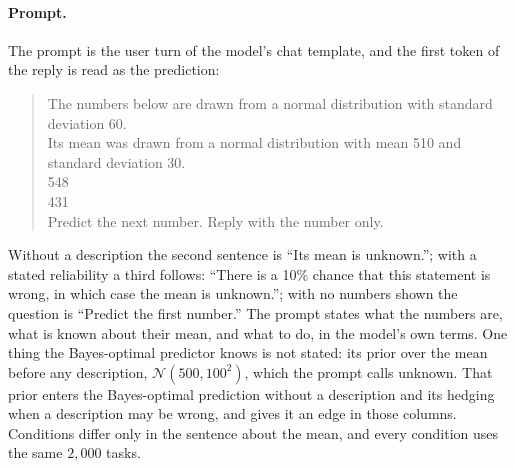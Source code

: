 \documentclass{article}
\begin{document}
\paragraph{Prompt.} The prompt is the user turn of the model's chat template, and the first token of the reply is read as the prediction:

\begin{quote}\small\ttfamily
The numbers below are drawn from a normal distribution with standard deviation 60.\\
Its mean was drawn from a normal distribution with mean 510 and standard deviation 30.\\[3pt]
548\\
431\\[3pt]
Predict the next number. Reply with the number only.
\end{quote}

\noindent Without a description the second sentence is ``Its mean is unknown.''; with a stated reliability a third follows: ``There is a 10\% chance that this statement is wrong, in which case the mean is unknown.''; with no numbers shown the question is ``Predict the first number.'' The prompt states what the numbers are, what is known about their mean, and what to do, in the model's own terms. One thing the Bayes-optimal predictor knows is not stated: its prior over the mean before any description, $\mathcal{N}(500, 100^2)$, which the prompt calls unknown. That prior enters the Bayes-optimal prediction without a description and its hedging when a description may be wrong, and gives it an edge in those columns. Conditions differ only in the sentence about the mean, and every condition uses the same $2{,}000$ tasks.
\end{document}
